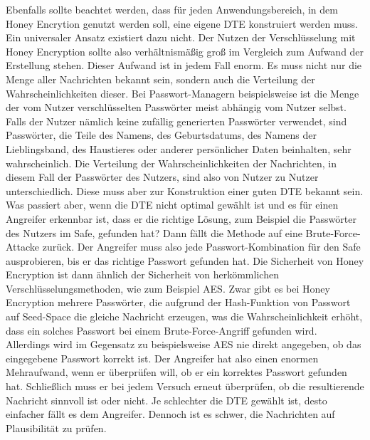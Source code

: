 \documentclass[12pt]{scrartcl}
\begin{document}
Ebenfalls sollte beachtet werden, dass für jeden Anwendungsbereich, in dem Honey Encrytion genutzt werden soll, eine eigene DTE konstruiert werden muss. Ein universaler Ansatz existiert dazu nicht. Der Nutzen der Verschlüsselung mit Honey Encryption sollte also verhältnismäßig groß im Vergleich zum Aufwand der Erstellung stehen. Dieser Aufwand ist in jedem Fall enorm. Es muss nicht nur die Menge aller Nachrichten bekannt sein, sondern auch die Verteilung der Wahrscheinlichkeiten dieser. Bei Passwort-Managern beispielsweise ist die Menge der vom Nutzer verschlüsselten Passwörter meist abhängig vom Nutzer selbst. Falls der Nutzer nämlich keine zufällig generierten Passwörter verwendet, sind Passwörter, die Teile des Namens, des Geburtsdatums, des Namens der Lieblingsband, des Haustieres oder anderer persönlicher Daten beinhalten, sehr wahrscheinlich. Die Verteilung der Wahrscheinlichkeiten der Nachrichten, in diesem Fall der Passwörter des Nutzers, sind also von Nutzer zu Nutzer unterschiedlich. Diese muss aber zur Konstruktion einer guten DTE bekannt sein. Was passiert aber, wenn die DTE nicht optimal gewählt ist und es für einen Angreifer erkennbar ist, dass er die richtige Lösung, zum Beispiel die Passwörter des Nutzers im Safe, gefunden hat? Dann fällt die Methode auf eine Brute-Force-Attacke zurück. Der Angreifer muss also jede Passwort-Kombination für den Safe ausprobieren, bis er das richtige Passwort gefunden hat. Die Sicherheit von Honey Encryption ist dann ähnlich der Sicherheit von herkömmlichen Verschlüsselungsmethoden, wie zum Beispiel AES. Zwar gibt es bei Honey Encryption mehrere Passwörter, die aufgrund der Hash-Funktion von Passwort auf Seed-Space die gleiche Nachricht erzeugen, was die Wahrscheinlichkeit erhöht, dass ein solches Passwort bei einem Brute-Force-Angriff gefunden wird. Allerdings wird im Gegensatz zu beispielsweise AES nie direkt angegeben, ob das eingegebene Passwort korrekt ist. Der Angreifer hat also einen enormen Mehraufwand, wenn er überprüfen will, ob er ein korrektes Passwort gefunden hat. Schließlich muss er bei jedem Versuch erneut überprüfen, ob die resultierende Nachricht sinnvoll ist oder nicht. Je schlechter die DTE gewählt ist, desto einfacher fällt es dem Angreifer. Dennoch ist es schwer, die Nachrichten auf Plausibilität zu prüfen.
\end{document}

